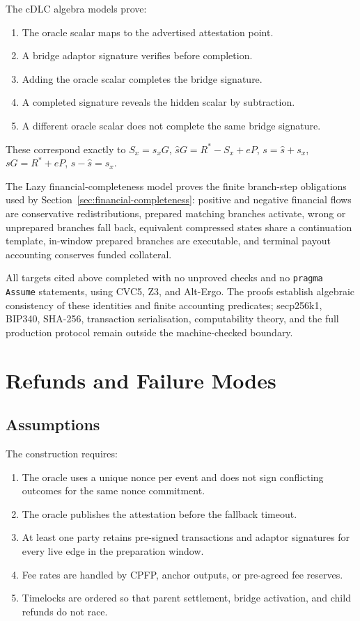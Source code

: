 \documentclass[11pt,a4paper]{article}
\newcommand{\code}[1]{\texttt{#1}}
\theoremstyle{claimstyle}
\begin{document}
The cDLC algebra models prove:
\begin{enumerate}[noitemsep]
  \item The oracle scalar maps to the advertised attestation point.
  \item A bridge adaptor signature verifies before completion.
  \item Adding the oracle scalar completes the bridge signature.
  \item A completed signature reveals the hidden scalar by subtraction.
  \item A different oracle scalar does not complete the same bridge signature.
\end{enumerate}
These correspond exactly to $S_x = s_x G$, $\hat{s}G = R^* - S_x + eP$,
$s = \hat{s} + s_x$, $sG = R^* + eP$, $s - \hat{s} = s_x$.

The Lazy financial-completeness model proves the finite branch-step obligations
used by Section~\ref{sec:financial-completeness}: positive and negative
financial flows are conservative redistributions, prepared matching branches
activate, wrong or unprepared branches fall back, equivalent compressed states
share a continuation template, in-window prepared branches are executable, and
terminal payout accounting conserves funded collateral.

All targets cited above completed with no unproved checks and no \code{pragma
Assume} statements, using CVC5, Z3, and Alt-Ergo. The proofs establish
algebraic consistency of these identities and finite accounting predicates;
secp256k1, BIP340, SHA-256, transaction serialisation, computability theory, and
the full production protocol remain outside the machine-checked boundary.

\section{Refunds and Failure Modes}

\subsection{Assumptions}

The construction requires:
\begin{enumerate}[noitemsep]
  \item The oracle uses a unique nonce per event and does not sign conflicting
    outcomes for the same nonce commitment.
  \item The oracle publishes the attestation before the fallback timeout.
  \item At least one party retains pre-signed transactions and adaptor
    signatures for every live edge in the preparation window.
  \item Fee rates are handled by CPFP, anchor outputs, or pre-agreed fee
    reserves.
  \item Timelocks are ordered so that parent settlement, bridge activation, and
    child refunds do not race.
\end{enumerate}
\end{document}
